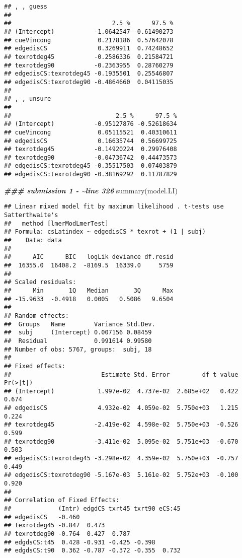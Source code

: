 \documentclass[
]{article}
\newenvironment{Shaded}{\begin{snugshade}}{\end{snugshade}}
\newcommand{\DocumentationTok}[1]{\textcolor[rgb]{0.56,0.35,0.01}{\textbf{\textit{#1}}}}
\newcommand{\FunctionTok}[1]{\textcolor[rgb]{0.00,0.00,0.00}{#1}}
\newcommand{\NormalTok}[1]{#1}
\begin{document}
\begin{verbatim}
## , , guess
## 
##                            2.5 %      97.5 %
## (Intercept)           -1.0642547 -0.61490273
## cueVincong             0.2178186  0.57642078
## edgedisCS              0.3269911  0.74248652
## texrotdeg45           -0.2586336  0.21584721
## texrotdeg90           -0.2363955  0.28760279
## edgedisCS:texrotdeg45 -0.1935501  0.25546807
## edgedisCS:texrotdeg90 -0.4864660  0.04115035
## 
## , , unsure
## 
##                             2.5 %      97.5 %
## (Intercept)           -0.95127876 -0.52618634
## cueVincong             0.05115521  0.40310611
## edgedisCS              0.16635744  0.56699725
## texrotdeg45           -0.14920224  0.29976408
## texrotdeg90           -0.04736742  0.44473573
## edgedisCS:texrotdeg45 -0.35517503  0.07403879
## edgedisCS:texrotdeg90 -0.38169292  0.11787829
\end{verbatim}

\begin{Shaded}
\begin{Highlighting}[]
\DocumentationTok{\#\#\# submission 1 {-} \textasciitilde{}line 326}
\FunctionTok{summary}\NormalTok{(model.LI)}
\end{Highlighting}
\end{Shaded}

\begin{verbatim}
## Linear mixed model fit by maximum likelihood . t-tests use Satterthwaite's
##   method [lmerModLmerTest]
## Formula: csLatindex ~ edgedisCS * texrot + (1 | subj)
##    Data: data
## 
##      AIC      BIC   logLik deviance df.resid 
##  16355.0  16408.2  -8169.5  16339.0     5759 
## 
## Scaled residuals: 
##      Min       1Q   Median       3Q      Max 
## -15.9633  -0.4918   0.0005   0.5086   9.6504 
## 
## Random effects:
##  Groups   Name        Variance Std.Dev.
##  subj     (Intercept) 0.007156 0.08459 
##  Residual             0.991614 0.99580 
## Number of obs: 5767, groups:  subj, 18
## 
## Fixed effects:
##                         Estimate Std. Error         df t value Pr(>|t|)
## (Intercept)            1.997e-02  4.737e-02  2.685e+02   0.422    0.674
## edgedisCS              4.932e-02  4.059e-02  5.750e+03   1.215    0.224
## texrotdeg45           -2.419e-02  4.598e-02  5.750e+03  -0.526    0.599
## texrotdeg90           -3.411e-02  5.095e-02  5.751e+03  -0.670    0.503
## edgedisCS:texrotdeg45 -3.298e-02  4.359e-02  5.750e+03  -0.757    0.449
## edgedisCS:texrotdeg90 -5.167e-03  5.161e-02  5.752e+03  -0.100    0.920
## 
## Correlation of Fixed Effects:
##             (Intr) edgdCS txrt45 txrt90 eCS:45
## edgedisCS   -0.460                            
## texrotdeg45 -0.847  0.473                     
## texrotdeg90 -0.764  0.427  0.787              
## edgdsCS:t45  0.428 -0.931 -0.425 -0.398       
## edgdsCS:t90  0.362 -0.787 -0.372 -0.355  0.732
\end{verbatim}
\end{document}
